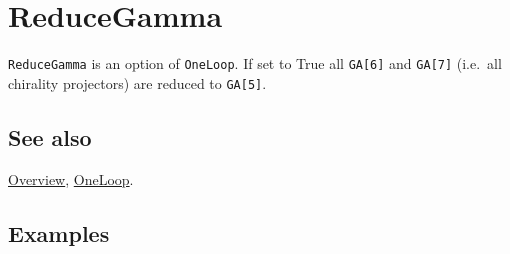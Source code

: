 \documentclass[../FeynCalcManual.tex]{subfiles}
\begin{document}
\hypertarget{reducegamma}{
\section{ReduceGamma}\label{reducegamma}}

\texttt{ReduceGamma} is an option of \texttt{OneLoop}. If set to True
all \texttt{GA[\allowbreak{}6]} and \texttt{GA[\allowbreak{}7]}
(i.e.~all chirality projectors) are reduced to
\texttt{GA[\allowbreak{}5]}.

\subsection{See also}

\hyperlink{toc}{Overview}, \hyperlink{oneloop}{OneLoop}.

\subsection{Examples}
\end{document}

